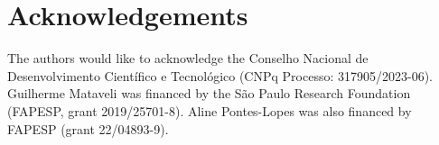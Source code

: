\section{Acknowledgements}

The authors would like to acknowledge the Conselho Nacional de Desenvolvimento 
Científico e Tecnológico (CNPq Processo: 317905/2023-06). 
Guilherme Mataveli was financed by the São Paulo Research Foundation (FAPESP, 
grant 2019/25701-8).
Aline Pontes-Lopes was also financed by FAPESP (grant 22/04893-9).
